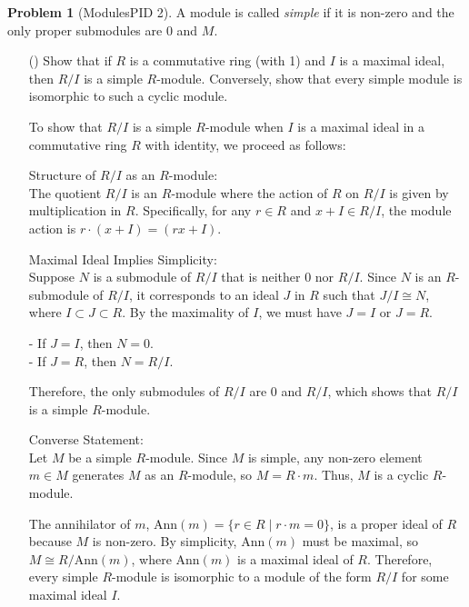 \documentclass[12pt]{article}
\theoremstyle{definition}
\newtheorem{problem}{Problem}
\newcounter{subq}[problem]
\newenvironment{subproblem}
{\refstepcounter{subq} \begin{itemize} \item[(\alph{subq})]}
{\end{itemize} \medskip}
\begin{document}
\begin{problem} [ModulesPID 2]
    A module is called \textit{simple} if it is non-zero and the only proper submodules are 0 and $M$.

    \begin{subproblem}
        Show that if $R$ is a commutative ring (with 1) and $I$ is a maximal ideal, then $R/I$ is a simple $R$-module.
        Conversely, show that every simple module is isomorphic to such a cyclic module.

        \begin{solution}

            To show that \( R/I \) is a simple \( R \)-module when \( I \) is a maximal ideal in a commutative ring \( R \) with identity, we proceed as follows:

            Structure of \( R/I \) as an \( R \)-module:\\  
            The quotient \( R/I \) is an \( R \)-module where the action of \( R \) on \( R/I \) is given by multiplication in \( R \). Specifically, for any \( r \in R \) and \( x + I \in R/I \), the module action is \( r \cdot (x + I) = (rx + I) \).

            Maximal Ideal Implies Simplicity:\\
            Suppose \( N \) is a submodule of \( R/I \) that is neither \( 0 \) nor \( R/I \). Since \( N \) is an \( R \)-submodule of \( R/I \), it corresponds to an ideal \( J \) in \( R \) such that \( J/I \cong N \), where \( I \subset J \subset R \). By the maximality of \( I \), we must have \( J = I \) or \( J = R \).

            - If \( J = I \), then \( N = 0 \).\\
            - If \( J = R \), then \( N = R/I \).

            Therefore, the only submodules of \( R/I \) are \( 0 \) and \( R/I \), which shows that \( R/I \) is a simple \( R \)-module.

            Converse Statement:\\
            Let \( M \) be a simple \( R \)-module. Since \( M \) is simple, any non-zero element \( m \in M \) generates \( M \) as an \( R \)-module, so \( M = R \cdot m \). Thus, \( M \) is a cyclic \( R \)-module.

            The annihilator of \( m \), \( \text{Ann}(m) = \{ r \in R \mid r \cdot m = 0 \} \), is a proper ideal of \( R \) because \( M \) is non-zero. By simplicity, \( \text{Ann}(m) \) must be maximal, so \( M \cong R/\text{Ann}(m) \), where \( \text{Ann}(m) \) is a maximal ideal of \( R \). Therefore, every simple \( R \)-module is isomorphic to a module of the form \( R/I \) for some maximal ideal \( I \).



\end{solution}
\end{subproblem}
\end{problem}
\end{document}
